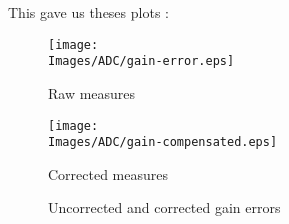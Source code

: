 This gave us theses plots :

\begin{figure}[!hbt]
    \centering
    \begin{minipage}[c]{0.48\textwidth}
        \centering
        \texttt{[image: \\Images/ADC/gain-error.eps]}
        \caption{Raw measures}\label{img:adc_error}
    \end{minipage}%
    \hfill%
    \begin{minipage}[c]{0.48\textwidth}
        \centering
        \texttt{[image: \\Images/ADC/gain-compensated.eps]}
        \caption{Corrected measures}\label{img:adc_corrected}
    \end{minipage}%
    \caption{Uncorrected and corrected gain errors}\label{img:adc_gainerr}
\end{figure}
\FloatBarrier


